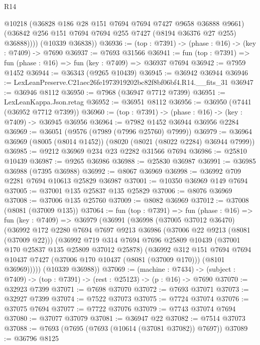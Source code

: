 \begin{lexlean}{R14}
\begin{coremodule}
            @10218
            (@36828 @186 @28 @151 @7694 @7694 @7427 @9658 @36888 @9661)
            (@36842 @256 @151 @7694 @7694 @255 @7427 (@8194 @36376 @27 @255) @36888))))
      (@10339 @36838))
@36936 := (top : @7391) -> (phase : @16) -> (key : @7409) -> @7690
@36937 := @7693 @31566
@36941 := fun (top : @7391) => fun (phase : @16) => fun (key : @7409) => @36937 @7694
@36942 := @7959 @1452
@36944 := @36343 (@9265 @10439)
@36945 := @36942 @36944
@36946 := LexLeanPreserve.C21aec26fe1973919202bc82f8bf06bf4.R14.__fits_31
@36947 := @36946 @8112
@36950 := @7968 (@36947 @7712 @7399)
@36951 := LexLeanKappa.Json.retag
@36952 := @36951 @8112
@36956 := @36950 (@7441 (@36952 @7712 @7399))
@36960 := (top : @7391) -> (phase : @16) -> (key : @7409) -> @36945 @36956
@36964 := @7982 @1452 @36944 @36956 @2284
@36969 := @36051 (@9576 (@7989 (@7996 @25760) @7999))
@36979 := @36964 @36969 (@8005 (@8014 @1452)) (@8020 (@8021 (@8022 @2284) @36944 @7999))
@36985 := @9212 @36969 @234 @23 @2282 @31566 @7694
@36986 := @25810 @10439
@36987 := @9265 @36986
@36988 := @25830 @36987
@36991 := @36985 @36988 (@7395 @36988)
@36992 := @8067 @36969
@36998 := @36992 @709 @2281 @7694 @10613 @25829 @36987
@37001 := @10350 @36969 @149 @7694
@37005 := @37001 @135 @25837 @135 @25829
@37006 := @8076 @36969
@37008 := @37006 @135 @25760
@37009 := @8082 @36969
@37012 := @37008 (@8081 (@37009 @135))
@37064 := fun (top : @7391) =>
  fun (phase : @16) =>
  fun (key : @7409) =>
  @36979
    (@36991
      (@36998
        (@37005 @37012 @36470)
        (@36992
          @172
          @2280
          @7694
          @7697
          @9213
          @36986
          (@37006 @22 @9213 (@8081 (@37009 @22)))
          (@36992
            @719
            @314
            @7694
            @7696
            @25809
            @10439
            (@37001 @170 @25837 @135 @25809 @37012 @25878)
            (@36992
              @312
              @151
              @7694
              @7694
              @10437
              @7427
              (@37006 @170 @10437 (@8081 (@37009 @170)))
              (@8101 @36969)))))
      (@10339 @36988))
@37069 := (machine : @7434) ->
  (subject : @7409) -> (top : @7391) -> (rest : @25123) -> (p : @16) -> @7690
@37070 := @32923 @7399
@37071 := @7698 @37070
@37072 := @7693 @37071
@37073 := @32927 @7399
@37074 := @7522 @37073
@37075 := @7724 @37074
@37076 := @37075 @7694
@37077 := @7722 @37076
@37079 := @7743 @37074 @7694
@37080 := @37077 @37079
@37081 := @36947 @22
@37082 := @7514 @37073
@37088 := @7693 (@7695 (@7693 (@10614 (@37081 @37082)) @7697))
@37089 := @36796 @8125

\end{coremodule}
\end{lexlean}
